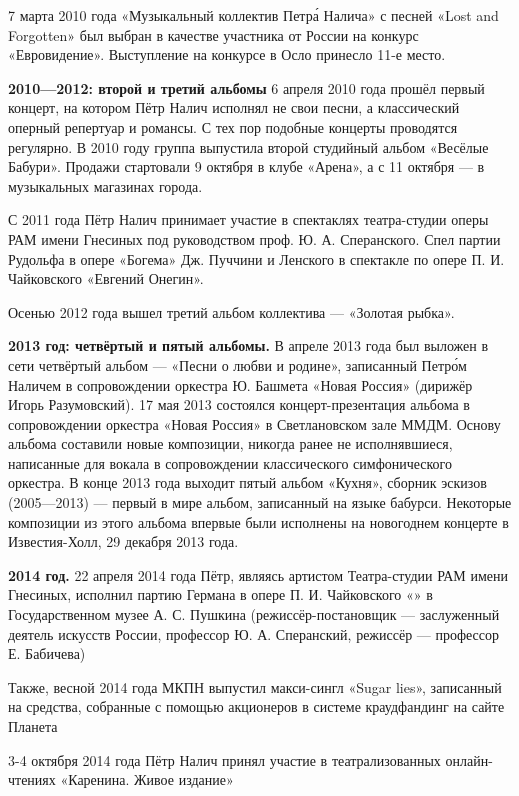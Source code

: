 7 марта 2010 года «Музыкальный коллектив Петр\'{а} Налича» с песней «Lost and Forgotten» был выбран в качестве участника от России на конкурс «Евровидение». Выступление на конкурсе в Осло принесло 11-е место.

\textbf{2010---2012: второй и третий альбомы}
6 апреля 2010 года прошёл первый концерт, на котором Пётр Налич исполнял не свои песни, а классический оперный репертуар и романсы. С тех пор подобные концерты проводятся регулярно. В 2010 году группа выпустила второй студийный альбом «Весёлые Бабури». Продажи стартовали 9 октября в клубе «Арена», а с 11 октября --- в музыкальных магазинах города.

С 2011 года Пётр Налич принимает участие в спектаклях театра-студии оперы РАМ имени Гнесиных под руководством проф. Ю. А. Сперанского. Спел партии Рудольфа в опере «Богема» Дж. Пуччини и Ленского в спектакле по опере П. И. Чайковского «Евгений Онегин».

Осенью 2012 года вышел третий альбом коллектива --- «Золотая рыбка».


\textbf{2013 год: четвёртый и пятый альбомы.}
В апреле 2013 года был выложен в сети четвёртый альбом --- «Песни о любви и родине», записанный Петр\'{о}м Наличем в сопровождении оркестра Ю. Башмета «Новая Россия» (дирижёр Игорь Разумовский). 17 мая 2013 состоялся концерт-презентация альбома в сопровождении оркестра «Новая Россия» в Светлановском зале ММДМ. Основу альбома составили новые композиции, никогда ранее не исполнявшиеся, написанные для вокала в сопровождении классического симфонического оркестра. В конце 2013 года выходит пятый альбом «Кухня», сборник эскизов (2005---2013) --- первый в мире альбом, записанный  на языке бабурси. Некоторые композиции из этого альбома впервые были исполнены на новогоднем концерте в Известия-Холл, 29 декабря 2013 года.

\textbf{2014 год.}
22 апреля 2014 года Пётр, являясь артистом Театра-студии РАМ имени Гнесиных, исполнил партию Германа в опере П. И. Чайковского «» в Государственном музее А. С. Пушкина (режиссёр-постановщик --- заслуженный деятель искусств России, профессор Ю. А. Сперанский, режиссёр --- профессор Е. Бабичева)

Также, весной 2014 года МКПН выпустил макси-сингл «Sugar lies», записанный на средства, собранные с помощью акционеров в системе краудфандинг на сайте Планета

3-4 октября 2014 года Пётр Налич принял участие в театрализованных онлайн-чтениях «Каренина. Живое издание»

